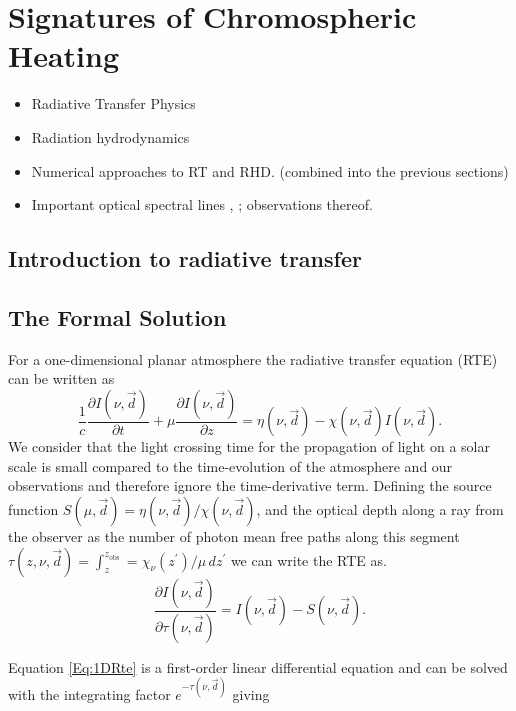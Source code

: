 \chapter{Signatures of Chromospheric Heating}

\begin{itemize}
    \item Radiative Transfer Physics
    \item Radiation hydrodynamics
    \item Numerical approaches to RT and RHD. (combined into the previous sections)
    \item Important optical spectral lines \Ha{}, \CaLine{}; observations thereof.
\end{itemize}

\section{Introduction to radiative transfer}
\section{The Formal Solution}

For a one-dimensional planar atmosphere the radiative transfer equation (RTE) can be written as
\begin{equation}
    \frac{1}{c}\frac{\partial I(\nu, \vec{d})}{\partial t} + \mu \frac{\partial I(\nu, \vec{d})}{\partial z} = \eta(\nu, \vec{d}) - \chi(\nu, \vec{d})I(\nu, \vec{d}).
\end{equation}
We consider that the light crossing time for the propagation of light on a solar scale is small compared to the time-evolution of the atmosphere and our observations and therefore ignore the time-derivative term.
Defining the source function $S(\mu, \vec{d}) = \eta(\nu, \vec{d}) / \chi(\nu, \vec{d})$, and the optical depth along a ray from the observer as the number of photon mean free paths along this segment $\tau(z, \nu, \vec{d}) = \int_z^{z_{\mathrm{obs}}} = \chi_\nu(z^\prime) / \mu\, dz^\prime$ we can write the RTE as.
\begin{equation}
    \frac{\partial I(\nu, \vec{d})}{\partial \tau(\nu, \vec{d})} = I(\nu, \vec{d}) - S(\nu, \vec{d}).
    \label{Eq:1DRte}
\end{equation}

Equation \ref{Eq:1DRte} is a first-order linear differential equation and can be solved with the integrating factor $e^{-\tau(\nu, \vec{d})}$ giving

